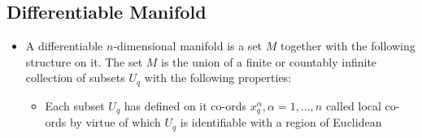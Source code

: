 \documentclass[11pt]{article}
\numberwithin{equation}{section}
\begin{document}
\subsection{Differentiable Manifold}
\begin{itemize}
  \item A differentiable $n$-dimensional manifold is a set $M$ together with the following structure on it. The set $M$ is the union of a finite or countably infinite collection of subsets $U_{q}$ with the following properties: 
  \begin{itemize}
     \item  Each subset $U_{q}$ has defined on it co-ords $x^{\alpha}_{q}, \alpha = 1,\ldots,n$ called local co-ords by virtue of which $U_{q}$ is identifiable with a  region of Euclidean 
   \end{itemize} 
\end{itemize}
\end{document}

